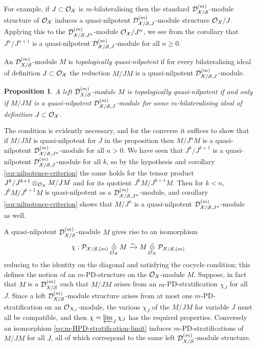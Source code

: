 \documentclass{article}
\theoremstyle{change}
\newtheorem{prop}[subsubsection]{Proposition}
\numberwithin{equation}{subsubsection}
\newcommand{\demobox}{\vrule height6pt width6pt depth0pt}
\newenvironment{demo}{\noindent{\it Proof.}}
{{\unskip\nobreak\hfil\qquad
\demobox\parfillskip=0pt\par}
\medskip}
\begin{document}
For example, if $J\subset{\cal O}_{\cal X}$ is $m$-bilateralising then the
standard ${{\cal D}}^{({m})}_{{\cal X}/{\cal S}}$-module structure of ${\cal O}_{\cal X}$ induces
a quasi-nilpotent ${{\cal D}}^{({m})}_{{\cal X}/{\cal S},J}$-module structure
${\cal O}_{\cal X}/J$. Applying this to the ${{\cal D}}^{({m})}_{{\cal X}/{\cal S},J^n}$-module
${\cal O}_{\cal X}/J^n$, we see from the corollary that $J^n/J^{n+1}$ is a
quasi-nilpotent ${{\cal D}}^{({m})}_{{\cal X}/{\cal S},J}$-module for all $n\ge0$.

An ${{\cal D}}^{({m})}_{X/{\cal S}}$-module $M$ is \textit{topologically
  quasi-nilpotent} if for every bilateralising ideal of definition
$J\subset{\cal O}_{\cal X}$ the reduction $M/JM$ is a quasi-nilpotent
${{\cal D}}^{({m})}_{{\cal X}/{\cal S},J}$-module.

\begin{prop}\label{prop:top-nilpotence-criterion}
  A left ${{\cal D}}^{({m})}_{X/{\cal S}}$-module $M$ is topologically
  quasi-nilpotent if and only if $M/JM$ is a quasi-nilpotent
  ${{\cal D}}^{({m})}_{{\cal X}/{\cal S},J}$-module for some $m$-bilateralising ideal
  of definition $J\subset{\cal O}_{\cal X}$.
\end{prop}
\begin{demo}
  The condition is evidently necessary, and for the converse it
  suffices to show that if $M/JM$ is quasi-nilpotent for $J$ in the
  proposition then $M/J^nM$ is a quasi-nilpotent
  ${{\cal D}}^{({m})}_{{\cal X}/{\cal S},J^n}$-module for all $n>0$. We have seen that
  $J^k/J^{k+1}$ is a quasi-nilpotent ${{\cal D}}^{({m})}_{{\cal X}/{\cal S},J}$-module
  for all $k$, so by the hypothesis and corollary
  \ref{cor:nilpotence-criterion} the same holds for the tensor product
  $J^k/J^{k+1}\otimes_{{\cal O}_{\cal X}}M/JM$ and for its quotient
  $J^kM/J^{k+1}M$. Then for $k<n$, $J^kM/J^{k+1}M$ is quasi-nilpotent
  as a ${{\cal D}}^{({m})}_{{\cal X}/{\cal S},J^n}$-module, and corollary
  \ref{cor:nilpotence-criterion} shows that $M/J^n$ is a
  quasi-nilpotent ${{\cal D}}^{({m})}_{{\cal X}/{\cal S},J^n}$-module as well.
\end{demo}

A quasi-nilpotent ${{\cal D}}^{({m})}_{X/{\cal S}}$-module $M$ gives rise to an
isomorphism
\begin{equation}
  \label{eq:m-HPD-stratification-limit}
  \chi:{\cal P}_{{\cal X}/{\cal S},(m)}\mathop{\hat\otimes}_{{\cal O}_{\cal X}}M\xrightarrow{\sim}
  M\mathop{\hat\otimes}_{{\cal O}_{\cal X}}{\cal P}_{{\cal X}/{\cal S},(m)} 
\end{equation}
reducing to the identity on the diagonal and satisfying the cocycle
condition; this defines the notion of an $m$-PD-structure on the
${\cal O}_{\cal X}$-module $M$. Suppose, in fact that $M$ is a
${{\cal D}}^{({m})}_{X/{\cal S}}$ such that $M/JM$ arises from an
$m$-PD-stratification $\chi_J$ for all $J$. Since a left
${{\cal D}}^{({m})}_{X/{\cal S}}$-module structure arises from at most one
$m$-PD-stratification on an ${\cal O}_{X_J}$-module, the various $\chi_J$ of
the $M/JM$ for variable $J$ must all be compatible, and then
$\chi=\varprojlim_J\chi_J$ has the required properties. Conversely an
isomorphism \ref{eq:m-HPD-stratification-limit} induces
$m$-PD-stratifications of $M/JM$ for all $J$, all of which correspond
to the same left ${{\cal D}}^{({m})}_{X/{\cal S}}$-module structure.
\end{document}
